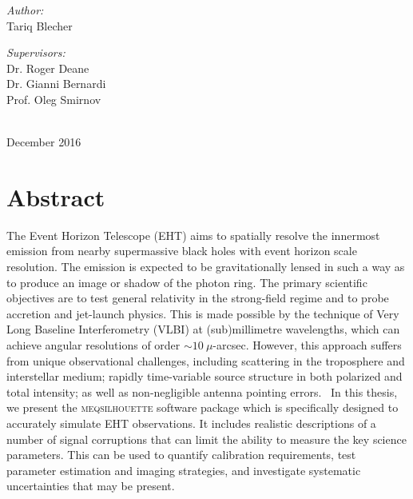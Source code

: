 \begin{titlepage}
\begin{minipage}{0.45\textwidth}
\begin{flushleft}\large 
\emph{Author:} \\
Tariq  {\sc Blecher}\\
\end{flushleft}
\end{minipage}
\begin{minipage}{0.45\textwidth}

\begin{flushright} \large
\emph{Supervisors:} \\
Dr. Roger {\sc Deane} \\
Dr. Gianni {\sc Bernardi} \\
Prof. Oleg {\sc Smirnov} \\
\end{flushright}
\end{minipage}\\[2cm]


{\large December 2016}

\end{titlepage}

\chapter*{Abstract} 
The Event Horizon Telescope (EHT) aims to spatially resolve the innermost emission from nearby supermassive black holes with event horizon scale resolution.
The emission is expected to be gravitationally lensed in such a way as to produce an image or shadow of the photon ring. The primary scientific objectives are to test general relativity in the strong-field regime 
and to probe accretion and jet-launch physics. 
This is made possible by the technique of Very Long Baseline Interferometry (VLBI) at (sub)millimetre wavelengths, which can achieve angular resolutions of order $\sim10~\mu$-arcsec. 
However, this approach suffers from unique observational challenges, including scattering in the troposphere and interstellar medium; rapidly time-variable source structure in both polarized and total intensity; as well as non-negligible antenna pointing errors.\
In this thesis, we present the \textsc{meqsilhouette} software package which is specifically designed to accurately simulate EHT observations. It includes realistic descriptions of a number of signal corruptions that can limit the ability to measure the key science parameters. This can be used to quantify calibration requirements, test parameter estimation and imaging strategies, and investigate systematic uncertainties that may be present.


